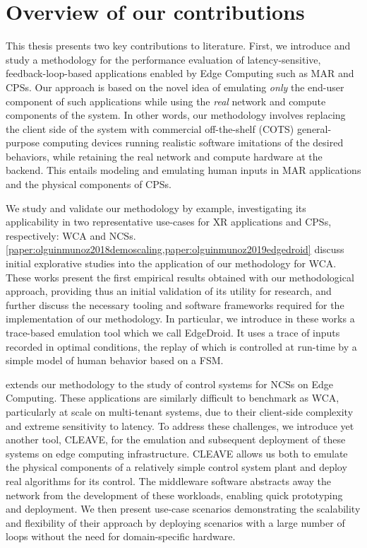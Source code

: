 \section{Overview of our contributions}\label{sec:contributions}

This thesis presents two key contributions to literature.
First, we introduce and study a methodology for the performance evaluation of latency-sensitive, feedback-loop-based applications enabled by Edge Computing such as \gls{MAR} and \glspl{CPS}.
Our approach is based on the novel idea of emulating \emph{only} the end-user component of such applications while using the \emph{real} network and compute components of the system.
In other words, our methodology involves replacing the client side of the system with commercial off-the-shelf (COTS) general-purpose computing devices running realistic software imitations of the desired behaviors, while retaining the real network and compute hardware at the backend.
This entails modeling and emulating human inputs in \gls{MAR} applications and the physical components of \glspl{CPS}.

We study and validate our methodology by example, investigating its applicability in two representative use-cases for \gls{XR} applications and \glspl{CPS}, respectively: \acf{WCA} and \acfp{NCS}.
\cref{paper:olguinmunoz2018demoscaling,paper:olguinmunoz2019edgedroid} discuss initial explorative studies into the application of our methodology for \gls{WCA}.
These works present the first empirical results obtained with our methodological approach, providing thus an initial validation of its utility for research, and further discuss the necessary tooling and software frameworks required for the implementation of our methodology.
In particular, we introduce in these works a trace-based emulation tool which we call EdgeDroid.
It uses a trace of inputs recorded in optimal conditions, the replay of which is controlled at run-time by a simple model of human behavior based on a \gls{FSM}.

 extends our methodology to the study of control systems for \glspl{NCS} on Edge Computing.
These applications are similarly difficult to benchmark as \gls{WCA}, particularly at scale on multi-tenant systems, due to their client-side complexity and extreme sensitivity to latency.
To address these challenges, we introduce yet another tool, \gls{CLEAVE}, for the emulation and subsequent deployment of these systems on edge computing infrastructure.
\gls{CLEAVE} allows us both to emulate the physical components of a relatively simple control system plant and deploy real algorithms for its control.
The middleware software abstracts away the network from the development of these workloads, enabling quick prototyping and deployment.
We then present use-case scenarios demonstrating the scalability and flexibility of their approach by deploying scenarios with a large number of loops without the need for domain-specific hardware.

